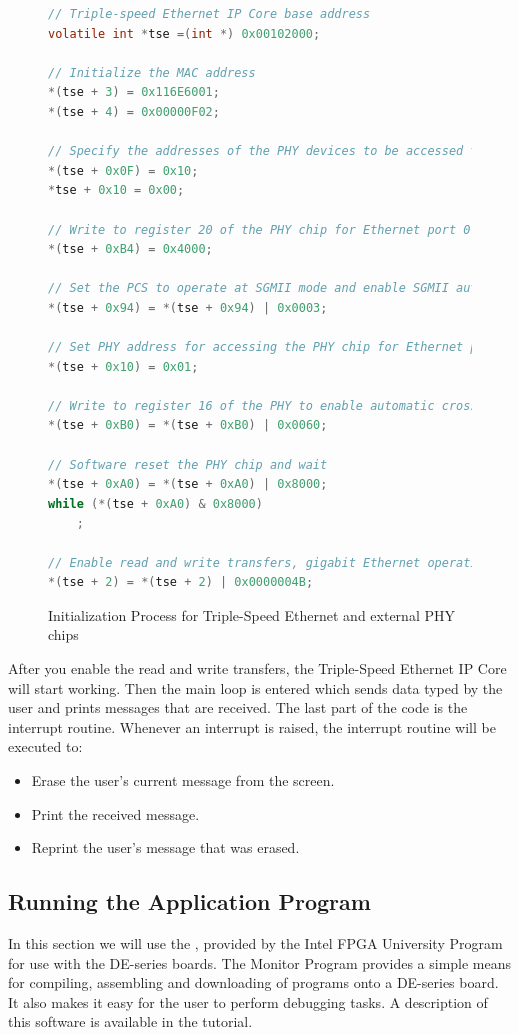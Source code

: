 \documentclass[11pt, twoside, pdftex]{article}
\begin{document}
\begin{figure}[H]
\begin{lstlisting}[language=C]
// Triple-speed Ethernet IP Core base address
volatile int *tse =(int *) 0x00102000;

// Initialize the MAC address
*(tse + 3) = 0x116E6001;
*(tse + 4) = 0x00000F02;

// Specify the addresses of the PHY devices to be accessed through MDIO interface
*(tse + 0x0F) = 0x10;
*tse + 0x10 = 0x00;

// Write to register 20 of the PHY chip for Ethernet port 0 to set up line loopback
*(tse + 0xB4) = 0x4000;

// Set the PCS to operate at SGMII mode and enable SGMII auto-negotiation
*(tse + 0x94) = *(tse + 0x94) | 0x0003;

// Set PHY address for accessing the PHY chip for Ethernet port 1
*(tse + 0x10) = 0x01;

// Write to register 16 of the PHY to enable automatic crossover for all modes
*(tse + 0xB0) = *(tse + 0xB0) | 0x0060;

// Software reset the PHY chip and wait
*(tse + 0xA0) = *(tse + 0xA0) | 0x8000;
while (*(tse + 0xA0) & 0x8000)
    ;

// Enable read and write transfers, gigabit Ethernet operation, and CRC forwarding
*(tse + 2) = *(tse + 2) | 0x0000004B;
\end{lstlisting}
	\caption{Initialization Process for Triple-Speed Ethernet and external PHY chips}
	\label{fig:tse_initialization}
\end{figure}

After you enable the read and write transfers, the Triple-Speed Ethernet IP Core will start working. Then the main loop is entered which sends data typed by the user and prints messages that are received. The last part of the code is the interrupt routine. Whenever an interrupt is raised, the interrupt routine will be executed to:

\begin{itemize}
	\item Erase the user's current message from the screen.
	\item Print the received message.
	\item Reprint the user's message that was erased.
\end{itemize}

\subsection{Running the Application Program}
In this section we will use the {\it \productNameMed{}}, provided by the Intel FPGA University Program for use with the DE-series boards. The Monitor Program provides a simple means for compiling, assembling and downloading of programs onto a DE-series board. It also makes it easy for the user to perform debugging tasks. A description of this software is available in the {\it \productNameMed{}} tutorial. 
\end{document}
